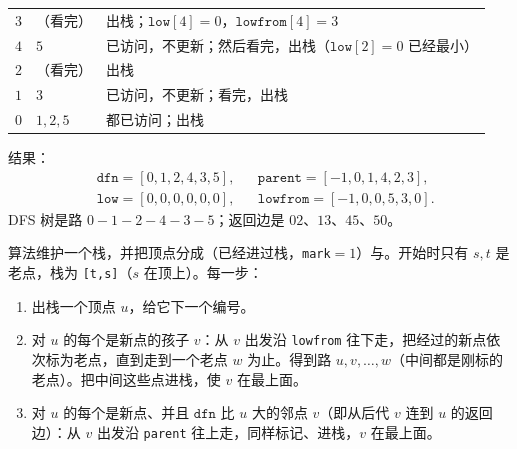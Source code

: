 \begin{example}
\begin{center}
\begin{tabular}{lll}
$3$ & （看完） & 出栈；$\texttt{low}[4]=0$，$\texttt{lowfrom}[4]=3$ \\
$4$ & $5$ & 已访问，不更新；然后看完，出栈（$\texttt{low}[2]=0$ 已经最小） \\
$2$ & （看完） & 出栈 \\
$1$ & $3$ & 已访问，不更新；看完，出栈 \\
$0$ & $1,2,5$ & 都已访问；出栈 \\
\bottomrule
\end{tabular}
\end{center}
结果：
\[
\begin{aligned}
&\texttt{dfn}=[0,1,2,4,3,5],&&\texttt{parent}=[-1,0,1,4,2,3],\\
&\texttt{low}=[0,0,0,0,0,0],&&\texttt{lowfrom}=[-1,0,0,5,3,0].
\end{aligned}
\]
DFS 树是路 $0-1-2-4-3-5$；返回边是 $02$、$13$、$45$、$50$。
\end{example}


算法维护一个栈，并把顶点分成（已经进过栈，\texttt{mark}$=1$）与。开始时只有 $s,t$ 是老点，栈为 \texttt{[t,s]}（$s$ 在顶上）。每一步：
\begin{enumerate}
\item 出栈一个顶点 $u$，给它下一个编号。
\item 对 $u$ 的每个是新点的孩子 $v$：从 $v$ 出发沿 \texttt{lowfrom} 往下走，把经过的新点依次标为老点，直到走到一个老点 $w$ 为止。得到路 $u,v,\dots,w$（中间都是刚标的老点）。把中间这些点进栈，使 $v$ 在最上面。
\item 对 $u$ 的每个是新点、并且 $\texttt{dfn}$ 比 $u$ 大的邻点 $v$（即从后代 $v$ 连到 $u$ 的返回边）：从 $v$ 出发沿 \texttt{parent} 往上走，同样标记、进栈，$v$ 在最上面。
\end{enumerate}

